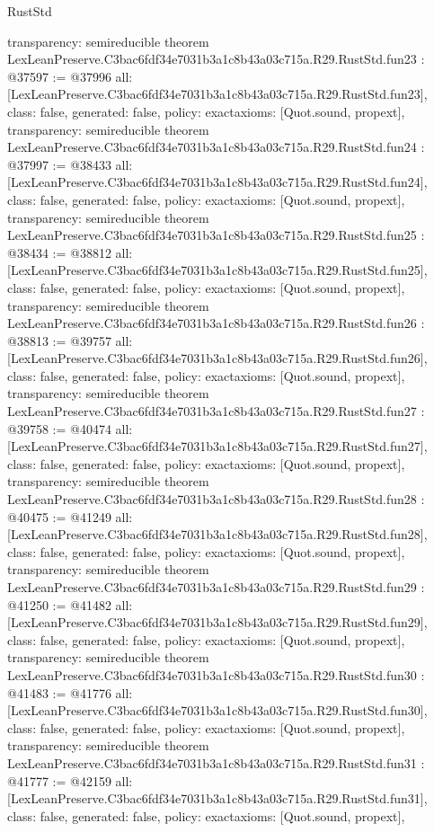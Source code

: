 \begin{lexlean}{RustStd}
\begin{coremodule}
{  transparency: semireducible
}
theorem LexLeanPreserve.C3bac6fdf34e7031b3a1c8b43a03c715a.R29.RustStd.fun23 : @37597 := @37996 {
  all: [LexLeanPreserve.C3bac6fdf34e7031b3a1c8b43a03c715a.R29.RustStd.fun23],
  class: false,
  generated: false,
  policy: exact{axioms: [Quot.sound, propext]},
  transparency: semireducible
}
theorem LexLeanPreserve.C3bac6fdf34e7031b3a1c8b43a03c715a.R29.RustStd.fun24 : @37997 := @38433 {
  all: [LexLeanPreserve.C3bac6fdf34e7031b3a1c8b43a03c715a.R29.RustStd.fun24],
  class: false,
  generated: false,
  policy: exact{axioms: [Quot.sound, propext]},
  transparency: semireducible
}
theorem LexLeanPreserve.C3bac6fdf34e7031b3a1c8b43a03c715a.R29.RustStd.fun25 : @38434 := @38812 {
  all: [LexLeanPreserve.C3bac6fdf34e7031b3a1c8b43a03c715a.R29.RustStd.fun25],
  class: false,
  generated: false,
  policy: exact{axioms: [Quot.sound, propext]},
  transparency: semireducible
}
theorem LexLeanPreserve.C3bac6fdf34e7031b3a1c8b43a03c715a.R29.RustStd.fun26 : @38813 := @39757 {
  all: [LexLeanPreserve.C3bac6fdf34e7031b3a1c8b43a03c715a.R29.RustStd.fun26],
  class: false,
  generated: false,
  policy: exact{axioms: [Quot.sound, propext]},
  transparency: semireducible
}
theorem LexLeanPreserve.C3bac6fdf34e7031b3a1c8b43a03c715a.R29.RustStd.fun27 : @39758 := @40474 {
  all: [LexLeanPreserve.C3bac6fdf34e7031b3a1c8b43a03c715a.R29.RustStd.fun27],
  class: false,
  generated: false,
  policy: exact{axioms: [Quot.sound, propext]},
  transparency: semireducible
}
theorem LexLeanPreserve.C3bac6fdf34e7031b3a1c8b43a03c715a.R29.RustStd.fun28 : @40475 := @41249 {
  all: [LexLeanPreserve.C3bac6fdf34e7031b3a1c8b43a03c715a.R29.RustStd.fun28],
  class: false,
  generated: false,
  policy: exact{axioms: [Quot.sound, propext]},
  transparency: semireducible
}
theorem LexLeanPreserve.C3bac6fdf34e7031b3a1c8b43a03c715a.R29.RustStd.fun29 : @41250 := @41482 {
  all: [LexLeanPreserve.C3bac6fdf34e7031b3a1c8b43a03c715a.R29.RustStd.fun29],
  class: false,
  generated: false,
  policy: exact{axioms: [Quot.sound, propext]},
  transparency: semireducible
}
theorem LexLeanPreserve.C3bac6fdf34e7031b3a1c8b43a03c715a.R29.RustStd.fun30 : @41483 := @41776 {
  all: [LexLeanPreserve.C3bac6fdf34e7031b3a1c8b43a03c715a.R29.RustStd.fun30],
  class: false,
  generated: false,
  policy: exact{axioms: [Quot.sound, propext]},
  transparency: semireducible
}
theorem LexLeanPreserve.C3bac6fdf34e7031b3a1c8b43a03c715a.R29.RustStd.fun31 : @41777 := @42159 {
  all: [LexLeanPreserve.C3bac6fdf34e7031b3a1c8b43a03c715a.R29.RustStd.fun31],
  class: false,
  generated: false,
  policy: exact{axioms: [Quot.sound, propext]},
}
\end{coremodule}
\end{lexlean}
